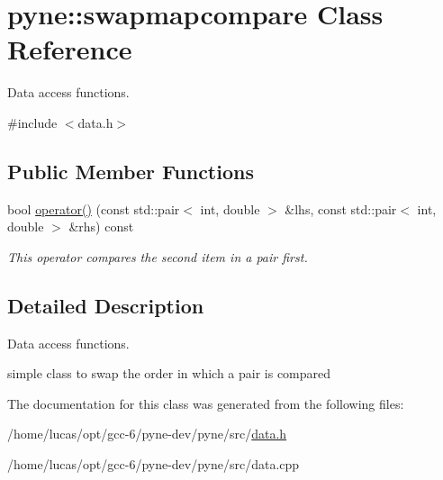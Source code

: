 \hypertarget{classpyne_1_1swapmapcompare}{}\section{pyne\+:\+:swapmapcompare Class Reference}
\label{classpyne_1_1swapmapcompare}


Data access functions.  




{\ttfamily \#include $<$data.\+h$>$}

\subsection*{Public Member Functions}
\begin{DoxyCompactItemize}
\item 
bool \hyperlink{classpyne_1_1swapmapcompare_a766adfc375aa681d00aa60ac66a1fdd9}{operator()} (const std\+::pair$<$ int, double $>$ \&lhs, const std\+::pair$<$ int, double $>$ \&rhs) const \hypertarget{classpyne_1_1swapmapcompare_a766adfc375aa681d00aa60ac66a1fdd9}{}\label{classpyne_1_1swapmapcompare_a766adfc375aa681d00aa60ac66a1fdd9}

\begin{DoxyCompactList}\small\item\em This operator compares the second item in a pair first. \end{DoxyCompactList}\end{DoxyCompactItemize}


\subsection{Detailed Description}
Data access functions. 

simple class to swap the order in which a pair is compared 

The documentation for this class was generated from the following files\+:\begin{DoxyCompactItemize}
\item 
/home/lucas/opt/gcc-\/6/pyne-\/dev/pyne/src/\hyperlink{data_8h}{data.\+h}\item 
/home/lucas/opt/gcc-\/6/pyne-\/dev/pyne/src/data.\+cpp\end{DoxyCompactItemize}
